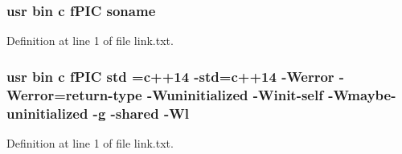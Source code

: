 \subsubsection[{\texorpdfstring{soname}{soname}}]{\setlength{\rightskip}{0pt plus 5cm}usr bin {\bf c} f\+P\+IC soname}\hypertarget{extension_2CMakeFiles_2cpu__extension_8dir_2link_8txt_ab65a9b6457c4853ed17f89f945516e66}{}\label{extension_2CMakeFiles_2cpu__extension_8dir_2link_8txt_ab65a9b6457c4853ed17f89f945516e66}


Definition at line 1 of file link.\+txt.

\subsubsection[{\texorpdfstring{std}{std}}]{\setlength{\rightskip}{0pt plus 5cm}usr bin {\bf c} f\+P\+IC std ={\bf c}++14 -\/std={\bf c}++14 -\/Werror -\/Werror=return-\/type -\/Wuninitialized -\/Winit-\/self -\/Wmaybe-\/uninitialized -\/g -\/shared -\/{\bf Wl}}\hypertarget{extension_2CMakeFiles_2cpu__extension_8dir_2link_8txt_a5f87c8f8e33670f7c8c5221b6be1bcc4}{}\label{extension_2CMakeFiles_2cpu__extension_8dir_2link_8txt_a5f87c8f8e33670f7c8c5221b6be1bcc4}


Definition at line 1 of file link.\+txt.

